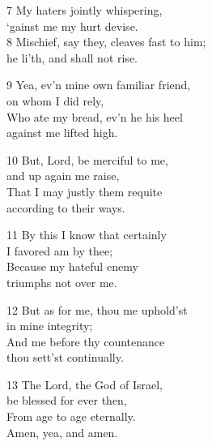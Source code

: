 \begin{multicols}{3}
7 My haters jointly whispering,\\
‘gainst me my hurt devise.\\
8 Mischief, say they, cleaves fast to him;\\
he li’th, and shall not rise.

9 Yea, ev’n mine own familiar friend,\\
on whom I did rely,\\
Who ate my bread, ev’n he his heel\\
against me lifted high.

10 But, Lord, be merciful to me,\\
and up again me raise,\\
That I may justly them requite\\
according to their ways.

11 By this I know that certainly\\
I favored am by thee;\\
Because my hateful enemy\\
triumphs not over me.

12 But as for me, thou me uphold’st\\
in mine integrity;\\
And me before thy countenance\\
thou sett’st continually.

13 The Lord, the God of Israel,\\
be blessed for ever then,\\
From age to age eternally.\\
Amen, yea, and amen.
\begin{center}
\quad{}\quad{}
\end{center}

\end{multicols}

